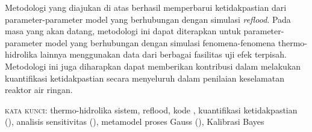 Metodologi yang diajukan di atas berhasil memperbarui ketidakpastian dari parameter-parameter model yang berhubungan dengan simulasi \emph{reflood}.
Pada masa yang akan datang, metodologi ini dapat diterapkan untuk parameter-parameter model yang berhubungan dengan simulasi fenomena-fenomena thermo-hidrolika lainnya menggunakan data dari berbagai fasilitas uji efek terpisah.
Metodologi ini juga diharapkan dapat memberikan kontribusi dalam melakukan kuantifikasi ketidakpastian secara menyeluruh dalam penilaian keselamatan reaktor air ringan.

\vfill

\textsc{kata kunci}:
thermo-hidrolika sistem,
reflood,
kode ,
kuantifikasi ketidakpastian (),
analisis sensitivitas (),
metamodel proses Gauss (),
Kalibrasi Bayes

\newpage

\endgroup			

\vfill

